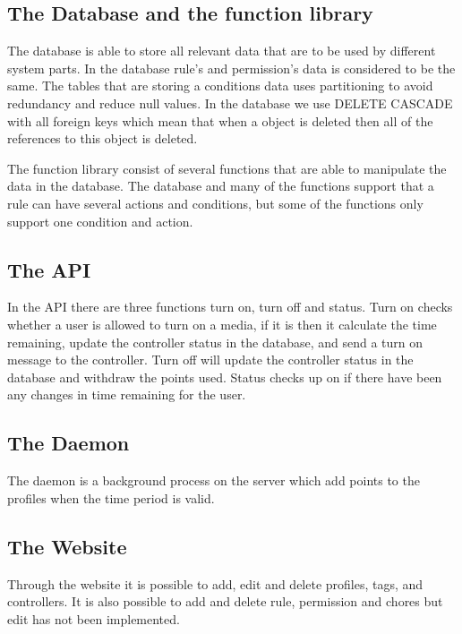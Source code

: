 \subsection*{The Database and the function library}
The database is able to store all relevant data that are to be used by different system parts. In the database rule's and permission's data is considered to be the same. The tables that are storing a conditions data uses partitioning to avoid redundancy and reduce null values. In the database we use DELETE CASCADE with all foreign keys which mean that when a object is deleted then all of the references to this object is deleted.

The function library consist of several functions that are able to manipulate the data in the database. The database and many of the functions support that a rule can have several actions and conditions, but some of the functions only support one condition and action.
 
\subsection*{The API}
In the API there are three functions turn on, turn off and status. Turn on checks whether a user is allowed to turn on a media, if it is then it calculate the time remaining, update the controller status in the database, and send a turn on message to the controller. Turn off will update the controller status in the database and withdraw the points used. Status checks up on if there have been any changes in time remaining for the user.

\subsection*{The Daemon}
The daemon is a background process on the server which add points to the profiles when the time period is valid. 

\subsection*{The Website}
Through the website it is possible to add, edit and delete profiles, tags, and controllers. It is also possible to add and delete rule, permission and chores but edit has not been implemented. 

